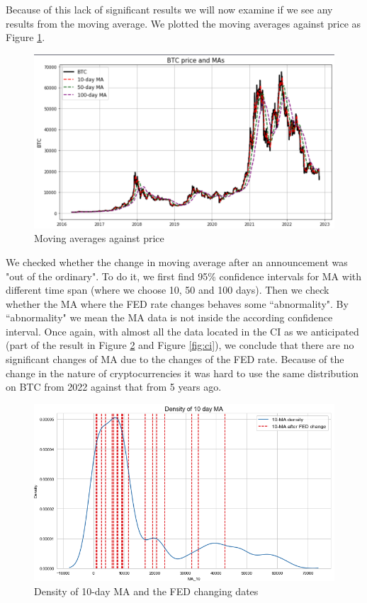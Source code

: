 \documentclass[12pt]{article}
\begin{document}
Because of this lack of significant results we will now examine if we see any results from the moving average. We plotted the moving averages against price as Figure \ref{fig:ma}.
\begin{figure}[H]
   \includegraphics[scale=0.7]{research_project/text/paper/2.png}
   \centering
   \caption{Moving averages against price}
   \label{fig:ma}
\end{figure}
We checked whether the change in moving average after an announcement was "out of the ordinary". To do it, we first find  95\% confidence intervals for MA with different time span (where we choose 10, 50 and 100 days). Then we check whether the MA where the FED rate changes behaves some ``abnormality". By ``abnormality" we mean the MA data is not inside the according confidence interval. Once again, with almost all the data located in the CI as we anticipated (part of the result in Figure \ref{fig:10dayma} and Figure \ref{fig:ci}), we conclude that there are no significant changes of MA due to the changes of the FED rate. Because of the change in the nature of cryptocurrencies it was hard to use the same distribution on BTC from 2022 against that from 5 years ago.
\begin{figure}[H]
   \includegraphics[width=\textwidth]{research_project/text/paper/density10ma.png}
   \centering
   \caption{Density of 10-day MA and the FED changing dates }
   \label{fig:10dayma}
\end{figure}
\end{document}
